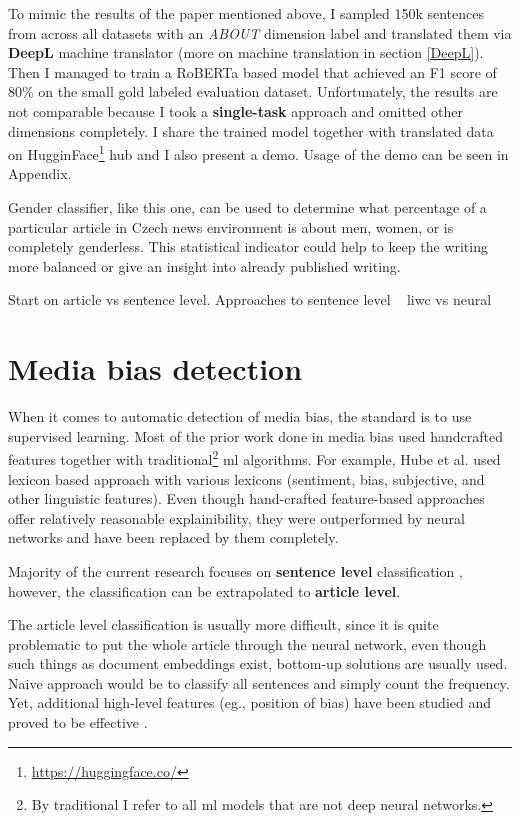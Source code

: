 To mimic the results of the paper mentioned above, I sampled 150k sentences from across all datasets with an \textit{ABOUT} dimension label and translated them via \textbf{DeepL} machine translator (more on machine translation in section \ref{DeepL}). Then I managed to train a RoBERTa based model that achieved an F1 score of 80\% on the small gold labeled evaluation dataset. Unfortunately, the results are not comparable because I took a \textbf{single-task} approach and omitted other dimensions completely. I share the trained model together with translated data on HugginFace\footnote{\url{https://huggingface.co/}} hub and I also present a demo. Usage of the demo can be seen in Appendix.

Gender classifier, like this one, can be used to determine what percentage of a particular article in Czech news environment is about men, women, or is completely genderless. This statistical indicator could help to keep the writing more balanced or give an insight into already published writing.





Start on article vs sentence level.
Approaches to sentence level ~ liwc vs neural

\section{Media bias detection}\label{mediabias}
When it comes to automatic detection of media bias, the standard is to use supervised learning. Most of the prior work done in media bias used handcrafted features together with traditional\footnote{By traditional I refer to all \Gls{ml} models that are not deep neural networks.} \Gls{ml} algorithms. For example, Hube et al. \cite{hube2018detecting} used lexicon based approach with various lexicons (sentiment, bias, subjective, and other linguistic features). Even though hand-crafted feature-based approaches offer relatively reasonable explainibility, they were outperformed by neural networks and have been replaced by them completely.

Majority of the current research focuses on \textbf{sentence level} classification \cite{sinha2021determining,Spinde2021MBIC,lee2021unifying,hube2019neural}, however, the classification can be extrapolated to \textbf{article level}.

The article level classification is usually more difficult, since it is quite problematic to put the whole article through the neural network, even though such things as document embeddings exist, bottom-up solutions are usually used. Naive approach would be to classify all sentences and simply count the frequency. Yet, additional high-level features (eg., position of bias) have been studied and proved to be effective  \cite{chen2020detecting,chen-etal-2020-analyzing}.


